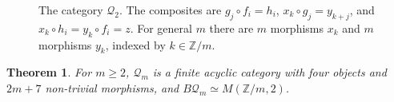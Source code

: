 \documentclass[12pt]{amsart}
\newtheorem{theorem}[teo]{Theorem}
\theoremstyle{definition}
\theoremstyle{remark}
\newcommand{\Z}{\mathbb{Z}}
\newcommand{\Q}{\mathcal{Q}}
\newcommand{\M}{M}
\begin{document}
\begin{figure}[ht]
\centering
{}
\caption{The category $\Q_2$. The composites are $g_j\circ f_i=h_i$, $x_k\circ g_j=y_{k+j}$, and $x_k\circ h_i=y_k\circ f_i=z$. For general $m$ there are $m$ morphisms $x_k$ and $m$ morphisms $y_k$, indexed by $k\in\Z/m$.}
\label{fig:Qm}
\end{figure}

\begin{theorem}\label{thm:Qm}
For $m\ge2$, $\Q_m$ is a finite acyclic category with four objects and $2m+7$ non-trivial morphisms, and $B\Q_m\simeq\M(\Z/m,2)$.
\end{theorem}
\end{document}
